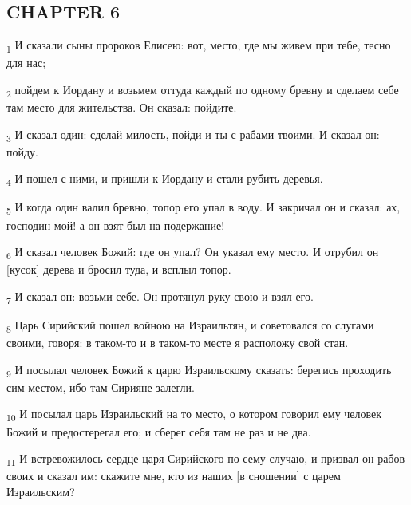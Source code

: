 \subsection{CHAPTER 6}
\begin{tcolorbox}
\textsubscript{1} И сказали сыны пророков Елисею: вот, место, где мы живем при тебе, тесно для нас;
\end{tcolorbox}
\begin{tcolorbox}
\textsubscript{2} пойдем к Иордану и возьмем оттуда каждый по одному бревну и сделаем себе там место для жительства. Он сказал: пойдите.
\end{tcolorbox}
\begin{tcolorbox}
\textsubscript{3} И сказал один: сделай милость, пойди и ты с рабами твоими. И сказал он: пойду.
\end{tcolorbox}
\begin{tcolorbox}
\textsubscript{4} И пошел с ними, и пришли к Иордану и стали рубить деревья.
\end{tcolorbox}
\begin{tcolorbox}
\textsubscript{5} И когда один валил бревно, топор его упал в воду. И закричал он и сказал: ах, господин мой! а он взят был на подержание!
\end{tcolorbox}
\begin{tcolorbox}
\textsubscript{6} И сказал человек Божий: где он упал? Он указал ему место. И отрубил он [кусок] дерева и бросил туда, и всплыл топор.
\end{tcolorbox}
\begin{tcolorbox}
\textsubscript{7} И сказал он: возьми себе. Он протянул руку свою и взял его.
\end{tcolorbox}
\begin{tcolorbox}
\textsubscript{8} Царь Сирийский пошел войною на Израильтян, и советовался со слугами своими, говоря: в таком-то и в таком-то месте я расположу свой стан.
\end{tcolorbox}
\begin{tcolorbox}
\textsubscript{9} И посылал человек Божий к царю Израильскому сказать: берегись проходить сим местом, ибо там Сирияне залегли.
\end{tcolorbox}
\begin{tcolorbox}
\textsubscript{10} И посылал царь Израильский на то место, о котором говорил ему человек Божий и предостерегал его; и сберег себя там не раз и не два.
\end{tcolorbox}
\begin{tcolorbox}
\textsubscript{11} И встревожилось сердце царя Сирийского по сему случаю, и призвал он рабов своих и сказал им: скажите мне, кто из наших [в сношении] с царем Израильским?
\end{tcolorbox}
